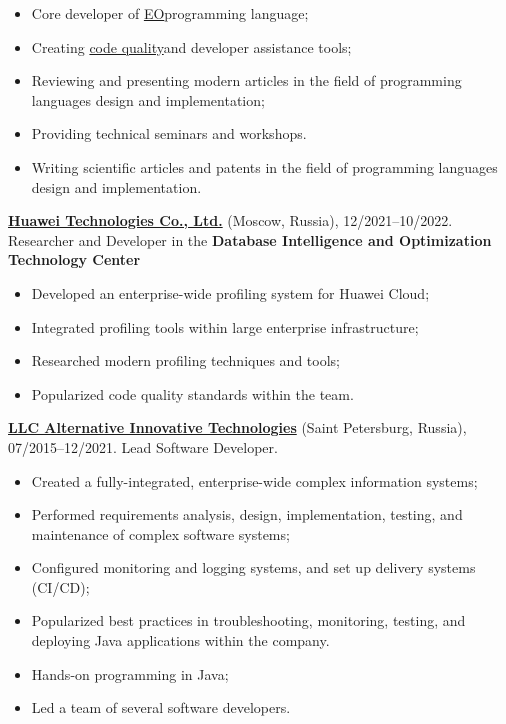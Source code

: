\documentclass{vl}
\begin{document}
    \begin{itemize}
        \itemsep0em
        \item Core developer of \href{https://github.com/objectionary/eo}{EO}programming language;
        \item
        Creating \href{https://github.com/volodya-lombrozo/jtcop}{code quality}and developer assistance tools;
        \item Reviewing and presenting modern articles in the field of programming languages design and implementation;
        \item Providing technical seminars and workshops.
        \item Writing scientific articles and patents in the field of programming languages design and implementation.
    \end{itemize}

    \textbf{\href{https://www.huawei.com}{Huawei Technologies Co., Ltd.}} (Moscow, Russia), 12/2021--10/2022.
    Researcher and Developer in the \textbf{Database Intelligence and Optimization Technology Center}

    \begin{itemize}
        \itemsep0em
        \item Developed an enterprise-wide profiling system for Huawei Cloud;
        \item Integrated profiling tools within large enterprise infrastructure;
        \item Researched modern profiling techniques and tools;
        \item Popularized code quality standards within the team.
    \end{itemize}

    \textbf{\href{https://altinntech.com/en/}{LLC Alternative Innovative Technologies}} (Saint Petersburg, Russia),
    07/2015--12/2021.
    Lead Software Developer.

    \begin{itemize}
        \itemsep0em
        \item Created a fully-integrated, enterprise-wide complex information systems;
        \item Performed requirements analysis, design, implementation, testing, and maintenance of complex software
        systems;
        \item Configured monitoring and logging systems, and set up delivery systems (CI/CD);
        \item Popularized best practices in troubleshooting, monitoring, testing, and deploying Java applications
        within the company.
        \item Hands-on programming in Java;
        \item Led a team of several software developers.
    \end{itemize}
\end{document}
